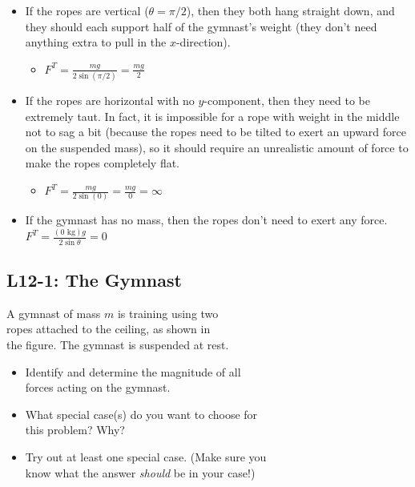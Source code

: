 \documentclass[]{article}
\newcommand{\Week}{12}
\begin{document}
\begin{TeacherMargin}
\begin{itemize}
	\item If the ropes are vertical ($\theta=\pi/2$), then they both hang straight down, and they should each support half of the gymnast's weight (they don't need anything extra to pull in the $x$-direction).
	\begin{itemize}
		\item $F^{T} = \frac{mg}{2\sin(\pi/2)} = \frac{mg}{2}$
	\end{itemize}
	\item If the ropes are horizontal with no $y$-component, then they need to be extremely taut. In fact, it is impossible for a rope with weight in the middle not to sag a bit (because the ropes need to be tilted to exert an upward force on the suspended mass), so it should require an unrealistic amount of force to make the ropes completely flat.
	\begin{itemize}
		\item $F^{T} = \frac{mg}{2\sin(0)} = \frac{mg}{0} = \infty$
	\end{itemize}
	\item If the gymnast has no mass, then the ropes don't need to exert any force. $F^{T} = \frac{(0\text{ kg})g}{2\sin\theta} = 0$
\end{itemize}
\end{TeacherMargin}
\begin{PresentSpace}
\vspace{-10pt}
\section*{L\Week-1: The Gymnast}
\vspace{-10pt}
A gymnast of mass $m$ is training using two \\
ropes attached to the ceiling, as shown in \\
the figure. The gymnast is suspended at rest.
\begin{itemize}
	\item Identify and determine the magnitude of all \\
	forces acting on the gymnast.
	\item What special case(s) do you want to choose for \\
	this problem? Why?
	\item Try out at least one special case. (Make sure you \\
	know what the answer \textit{should} be in your case!)
\end{itemize}
\end{PresentSpace}
\end{document}
